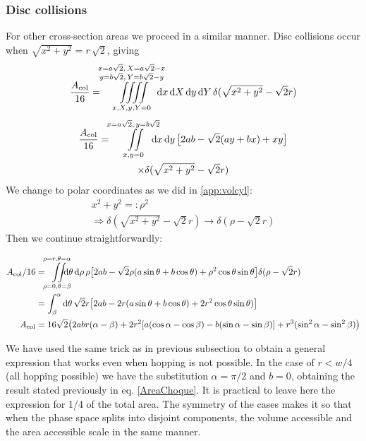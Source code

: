 \documentclass[superscriptaddress,pre,reprint,showpacs,twocolumn]{revtex4-1}
\newcommand{\rd}[1]{\mathrm{d}{#1} \,}
\begin{document}
  \subsubsection{Disc collisions}
  For other cross-section areas we proceed in a similar manner. 
  Disc collisions occur when $\sqrt{x^2 + y^2} = r \, \sqrt{2}$, giving
  \begin{equation}
    \frac{A_\text{col}}{16}  = \iiiint\limits_
         {x,X,y,Y=0}^
         {\substack{x=a\sqrt{2},\, X=a\sqrt{2}-x
             \\ y =  b\sqrt{2},\,  Y=b\sqrt{2}-y}}
         \mkern-18mu
    \rd x \rd X \rd y \rd Y
    \delta (\sqrt{x^2+y^2}-\sqrt{2}r)
  \end{equation}
  \begin{multline}
    \frac{A_\text{col}}{16}  = \iint \limits_{x,y=0}^
      {x=a\sqrt{2},\, y=b\sqrt{2}}
    \mkern-18mu \rd x \rd y 
    \bigl[ 2ab-\sqrt{2}(ay+bx)+xy \bigr] \\
    \times
    \delta (\sqrt{x^2+y^2}-\sqrt{2}r)\\
    \end{multline}
  We change to polar coordinates as we did in \ref{app:volcyl}:
  \begin{align}
    x^2+y^2 =: \rho^2 \\   \Rightarrow   \delta(\sqrt{x^2+y^2}-\sqrt{2}r) \rightarrow
    \delta(\rho-\sqrt{2}r)   
    \end{align}
  Then we continue straightforwardly:
  \begin{widetext}
    \begin{align}\label{app:colgeneral}
      A_\text{col}/16 & =\iint\limits_{\rho=0, \theta=\beta}^{\rho=r, \theta=\alpha}
      \mkern-18mu
    \rd \theta \rd \rho \rho
    \bigl[2ab-\sqrt{2}\rho(a\sin\theta+b\cos\theta)+\rho^2\cos\theta\sin\theta
      \bigr]
    \delta(\rho-\sqrt{2}r) \\
    &=\int_\beta^\alpha \rd \theta \sqrt{2}r
    \bigl[
      2ab-2r(a\sin\theta+b\cos\theta)+2r^2\cos\theta\sin\theta)
      \bigr] \\
    A_\text{col} & = 16\sqrt{2} \bigl( 2abr(\alpha-\beta)
    + 2r^2 [a (\cos \alpha-\cos\beta) -b (\sin\alpha -\sin\beta)]
     + r^3(\sin^2 \alpha -\sin^2\beta) \bigr)
    \end{align}
    \end{widetext}
    We have used the same trick as in previous subsection to obtain a general expression
    that works even when hopping is not possible.
    In the case of $r<w/4$ (all hopping possible)
    we have the substitution $\alpha=\pi/2$ and $b=0$,
    obtaining the result stated previously
    in eq. \ref{AreaChoque}. It is practical to leave here the expression for 1/4 of the
    total area. The symmetry of the cases makes it so that when the phase space splits
    into disjoint components, the volume accessible and the area accessible scale in
    the same manner.
    
\end{document}
